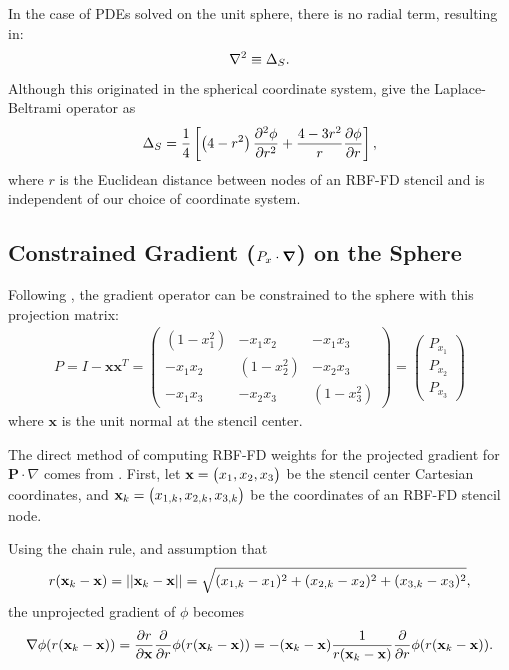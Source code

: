 \documentclass[11pt]{report}
\begin{document}
{In the case of PDEs solved on the unit sphere, there is no radial term, resulting in:
\begin{align}
\nabla^2 \equiv \Delta_S .
\end{align}
Although this originated in the spherical coordinate system, \cite{WrightFlyerYuen10} give the Laplace-Beltrami operator as
\begin{align*} 
\Delta_S = \frac{1}{4} \left[ \left(4-r^2\right) \frac{\partial^2 \phi}{\partial r^2} + \frac{4-3r^2}{r} \frac{\partial \phi}{\partial r} \right],
\end{align*} 
where $r$ is the Euclidean distance between nodes of an RBF-FD stencil and is independent of our choice of coordinate system. 

\subsection{Constrained Gradient ($P_{x} \cdot \grad$) on the Sphere}

Following \cite{FlyerWright09, FlyerLehto11}, the gradient operator can be constrained to the sphere with this projection matrix: 
\begin{align}
P = I - \mathbf{x} \mathbf{x}^T =  \begin{pmatrix} 
(1-x_1^2) & -x_1 x_2 & -x_1 x_3 \\
-x_1 x_2 & (1-x_2^2) & -x_2 x_3 \\ 
-x_1 x_3 & -x_2 x_3 & (1-x_3^2) 
\end{pmatrix} = \begin{pmatrix} P_{x_1} \\ P_{x_2} \\ P_{x_3} \end{pmatrix}
\label{eq:project_gradient}
\end{align}
where $\mathbf{x}$ is the unit normal at the stencil center. 


The direct method of computing RBF-FD weights for the projected gradient for $\mathbf{P} \cdot \nabla $ comes from \cite{FlyerWright09}. First, let $\mathbf{x} = \begin{pmatrix} x_1, x_2, x_3 \end{pmatrix} $ be the stencil center Cartesian coordinates, and $\mathbf{x}_k=\begin{pmatrix} x_{1,k}, x_{2,k}, x_{3,k}\end{pmatrix}$ be the coordinates of an RBF-FD stencil node. 

Using the chain rule, and assumption that 
$$r(\mathbf{x}_k-\mathbf{x})=\left|\left|\mathbf{x}_k-\mathbf{x}\right|\right| = \sqrt{(x_{1,k}-x_1)^2 + (x_{2,k}-x_2)^2 + (x_{3,k}-x_3)^2},$$
 the unprojected gradient of $\phi$ becomes
\begin{align*}
\nabla \phi(r(\mathbf{x}_k - \mathbf{x})) = \frac{\partial r}{\partial \mathbf{x}}  \frac{\partial }{\partial r} \phi(r(\mathbf{x}_k - \mathbf{x})) = - (\mathbf{x}_k - \mathbf{x})\frac{1}{r(\mathbf{x}_k - \mathbf{x})} \frac{\partial }{\partial r} \phi(r(\mathbf{x}_k - \mathbf{x})) .
\end{align*} 

}
\end{document}
